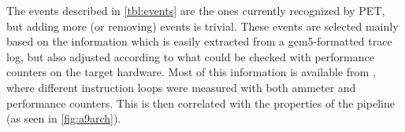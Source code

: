 The events described in \autoref{tbl:events} are the ones currently recognized
by PET, but adding more (or removing) events is trivial. These events are
selected mainly based on the information which is easily extracted from a
gem5-formatted trace log, but also adjusted according to what could be checked
with performance counters on the target hardware. Most of this information is
available from \cite{rundehvatum2013exploring}, where different instruction
loops were measured with both ammeter and performance counters. This is then
correlated with the properties of the pipeline (as seen in
\autoref{fig:a9arch}).

